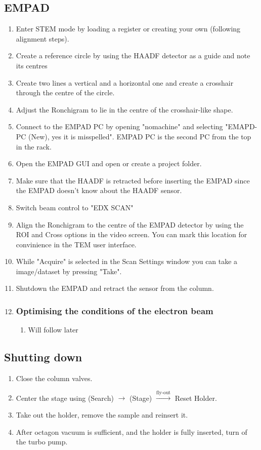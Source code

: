 \documentclass[a4paper]{scrartcl}
\begin{document}
\subsection*{EMPAD}
\begin{enumerate}
    \item Enter STEM mode by loading a register or creating your own (following alignment steps).
    \item Create a reference circle by using the HAADF detector as a guide and note its centres
    \item Create two lines a vertical and a horizontal one and create a crosshair through the centre of the circle.
    \item Adjust the Ronchigram to lie in the centre of the crosshair-like shape.
    \item Connect to the EMPAD PC by opening "nomachine" and selecting "EMAPD-PC (New), yes it is misspelled". EMPAD PC is the second PC from the top in the rack.
    \item Open the EMPAD GUI and open or create a project folder.
    \item Make sure that the HAADF is retracted before inserting the EMPAD since the EMPAD doesn't know about the HAADF sensor.
    \item Switch beam control to "EDX SCAN"
    \item Align the Ronchigram to the centre of the EMPAD detector by using the ROI and Cross options in the video screen. You can mark this location for convinience in the TEM user interface.
    \item While "Acquire" is selected in the Scan Settings window you can take a image/dataset by pressing "Take".
    \item Shutdown the EMPAD and retract the sensor from the column.
    \item {\subsubsection*{Optimising the conditions of the electron beam}
          \begin{enumerate}
              \item Will follow later            
          \end{enumerate}}
\end{enumerate}

\subsection*{Shutting down}
\begin{enumerate}
    \item Close the column valves.
    \item Center the stage using (Search) $\rightarrow$ (Stage) $\xrightarrow{\text{fly-out}}$ Reset Holder.
    \item Take out the holder, remove the sample and reinsert it.
    \item After octagon vacuum is sufficient, and the holder is fully inserted, turn of the turbo pump.
\end{enumerate}
\end{document}
